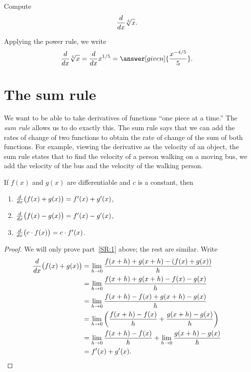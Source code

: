 \documentclass{ximera}
\begin{document}
\begin{example}
Compute
\[
\frac{d}{dx} \sqrt[5]{x}.
\]
\begin{explanation}
Applying the power rule, we write
\[
\ddx \sqrt[5]{x} = \ddx x^{1/5} = \answer[given]{\frac{x^{-4/5}}{5}}.
\]
\end{explanation}
\end{example}






\section{The sum rule}

We want to be able to take derivatives of functions ``one piece at a
time.'' The \textit{sum rule} allows us to do exactly this. The sum rule says
that we can add the rates of change of two functions to obtain the
rate of change of the sum of both functions. For example, viewing the
derivative as the velocity of an object, the sum rule states that to find the
velocity of a person walking on a moving bus, we add the
velocity of the bus and the velocity of the walking person.


\begin{theorem}\label{theorem:sum rule}
If $f(x)$ and $g(x)$ are differentiable and $c$ is a constant, then 
\begin{enumerate}
\item\label{SR:1} $\frac{d}{dx} \big( f(x) + g(x)\big) = f'(x) + g'(x)$,
\item $\frac{d}{dx} \big( f(x) - g(x)\big) = f'(x) - g'(x)$,
\item $\frac{d}{dx} \big(c\cdot f(x)\big) = c\cdot f'(x)$.
\end{enumerate}

\begin{proof}
We will only prove part~\ref{SR:1} above; the rest are similar. Write
\begin{align*}
\ddx\big(f(x)+g(x)\big) &= \lim_{ h\to 0} {f(x+h)+g(x+ h) - (f(x)+g(x))\over  h}  \\
&= \lim_{ h\to 0} {f(x+h)+g(x+ h) - f(x)-g(x)\over  h}  \\
&= \lim_{ h\to 0} {f(x+h)-f(x) +g(x+ h) -g(x)\over  h}  \\
&= \lim_{ h\to 0} \left({f(x+h)-f(x)\over  h}  +{g(x+ h) -g(x)\over  h}\right)  \\
&= \lim_{ h\to 0} {f(x+h)-f(x)\over  h}  +
\lim_{ h\to 0} {g(x+ h) -g(x)\over  h}  \\
&=f'(x)+g'(x).
\end{align*}
\end{proof}
\end{theorem}
\end{document}
